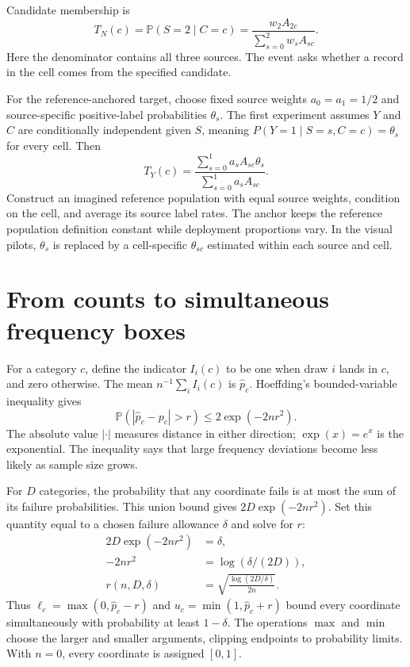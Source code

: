 \documentclass[11pt,a4paper]{report}
\newcommand{\Prob}{\mathbb P}
\begin{document}
Candidate membership is
\begin{equation}
T_N(c)=\Prob(S=2\mid C=c)=\frac{w_2A_{2c}}{\sum_{s=0}^2w_sA_{sc}}.
\end{equation}
Here the denominator contains all three sources. The event asks whether a record in the cell comes from the specified candidate.

For the reference-anchored target, choose fixed source weights $a_0=a_1=1/2$ and source-specific positive-label probabilities $\theta_s$. The first experiment assumes $Y$ and $C$ are conditionally independent given $S$, meaning $P(Y=1\mid S=s,C=c)=\theta_s$ for every cell. Then
\begin{equation}
T_Y(c)=\frac{\sum_{s=0}^1a_sA_{sc}\theta_s}{\sum_{s=0}^1a_sA_{sc}}.
\label{eq:anchored}
\end{equation}
Construct an imagined reference population with equal source weights, condition on the cell, and average its source label rates. The anchor keeps the reference population definition constant while deployment proportions vary. In the visual pilots, $\theta_s$ is replaced by a cell-specific $\theta_{sc}$ estimated within each source and cell.

\section{From counts to simultaneous frequency boxes}
For a category $c$, define the indicator $I_i(c)$ to be one when draw $i$ lands in $c$, and zero otherwise. The mean $n^{-1}\sum_iI_i(c)$ is $\widehat p_c$. Hoeffding's bounded-variable inequality gives
\begin{equation}
\Prob(|\widehat p_c-p_c|>r)\leq 2\exp(-2nr^2).
\end{equation}
The absolute value $|\cdot|$ measures distance in either direction; $\exp(x)=e^x$ is the exponential. The inequality says that large frequency deviations become less likely as sample size grows.

For $D$ categories, the probability that any coordinate fails is at most the sum of its failure probabilities. This union bound gives $2D\exp(-2nr^2)$. Set this quantity equal to a chosen failure allowance $\delta$ and solve for $r$:
\begin{align}
2D\exp(-2nr^2)&=\delta,\\
-2nr^2&=\log(\delta/(2D)),\\
r(n,D,\delta)&=\sqrt{\frac{\log(2D/\delta)}{2n}}.
\label{eq:radius}
\end{align}
Thus $\ell_c=\max(0,\widehat p_c-r)$ and $u_c=\min(1,\widehat p_c+r)$ bound every coordinate simultaneously with probability at least $1-\delta$. The operations $\max$ and $\min$ choose the larger and smaller arguments, clipping endpoints to probability limits. With $n=0$, every coordinate is assigned $[0,1]$.
\end{document}

